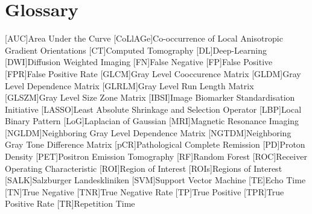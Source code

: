 
\section{Glossary}

\begin{acronym}[AAAAAAAAAAAA]
    [AUC]{Area Under the Curve}
    [CoLlAGe]{Co-occurrence of Local Anisotropic Gradient Orientations}
    [CT]{Computed Tomography}
    [DL]{Deep-Learning}
    [DWI]{Diffusion Weighted Imaging}
    [FN]{False Negative}
    [FP]{False Positive}
    [FPR]{False Positive Rate}
    [GLCM]{Gray Level Cooccurence Matrix}
    [GLDM]{Gray Level Dependence Matrix}
    [GLRLM]{Gray Level Run Length Matrix}
    [GLSZM]{Gray Level Size Zone Matrix}
    [IBSI]{Image Biomarker Standardisation Initiative}
    [LASSO]{Least Absolute Shrinkage and Selection Operator}
    [LBP]{Local Binary Pattern}
    [LoG]{Laplacian of Gaussian}
    [MRI]{Magnetic Resonance Imaging}
    [NGLDM]{Neighboring Gray Level Dependence Matrix}
    [NGTDM]{Neighboring Gray Tone Difference Matrix}
    [pCR]{Pathological Complete Remission}
    [PD]{Proton Density}
    [PET]{Positron Emission Tomography}
    [RF]{Random Forest}
    [ROC]{Receiver Operating Characteristic}
    [ROI]{Region of Interest}
    [ROIs]{Regions of Interest}
    [SALK]{Salzburger Landeskliniken}
    [SVM]{Support Vector Machine}
    [TE]{Echo Time}
    [TN]{True Negative}
    [TNR]{True Negative Rate}
    [TP]{True Positive}
    [TPR]{True Positive Rate}
    [TR]{Repetition Time}
\end{acronym}